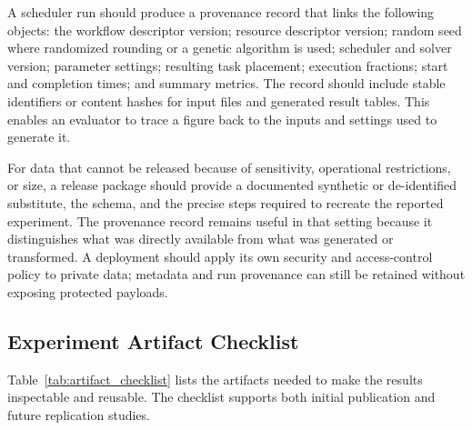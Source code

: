 A scheduler run should produce a provenance record that links the following objects: the workflow descriptor version; resource descriptor version; random seed where randomized rounding or a genetic algorithm is used; scheduler and solver version; parameter settings; resulting task placement; execution fractions; start and completion times; and summary metrics. The record should include stable identifiers or content hashes for input files and generated result tables. This enables an evaluator to trace a figure back to the inputs and settings used to generate it.

For data that cannot be released because of sensitivity, operational restrictions, or size, a release package should provide a documented synthetic or de-identified substitute, the schema, and the precise steps required to recreate the reported experiment. The provenance record remains useful in that setting because it distinguishes what was directly available from what was generated or transformed. A deployment should apply its own security and access-control policy to private data; metadata and run provenance can still be retained without exposing protected payloads.

\subsection{Experiment Artifact Checklist}

Table~\ref{tab:artifact_checklist} lists the artifacts needed to make the results inspectable and reusable. The checklist supports both initial publication and future replication studies.

